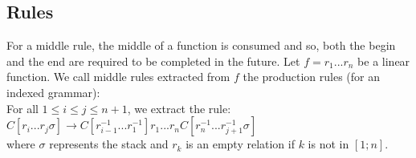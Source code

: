 \subsection{Rules}





\begin{Definition}
\label{middleRule}
For a middle rule, the middle of a function is consumed and so, both the begin and the end are required to be completed in the future. Let $f=r_1...r_n$ be a linear function. We call middle rules extracted from $f$ the production rules (for an indexed grammar):\\
For all $ 1 \leq i \leq j \leq n + 1 $, we extract the rule:\\
$C[r_i ... r_j \sigma] \rightarrow C[r_{i-1}^{-1} ... r_1^{-1}]r_1 ... r_n C[r_n^{-1} ... r_{j+1}^{-1} \sigma]$ \\
where $\sigma$ represents the stack and $r_k$ is an empty relation if $k$ is not in $[1; n]$.
\end{Definition}

